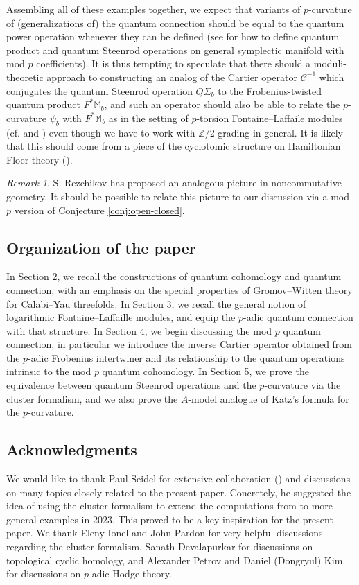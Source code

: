 \documentclass[reqno]{amsart}
\numberwithin{equation}{section}
\numberwithin{equation}{section}
\numberwithin{equation}{section}
\theoremstyle{definition}
\theoremstyle{remark}
\theoremstyle{remark}
\newtheorem{rem}[thm]{Remark}
\begin{document}
Assembling all of these examples together, we expect that variants of $p$-curvature of (generalizations of) the quantum connection should be equal to the quantum power operation whenever they can be defined (see \cite{Bai_Xu_2026} for how to define quantum product and quantum Steenrod operations on general symplectic manifold with mod $p$ coefficients). It is thus tempting to speculate that there should a moduli-theoretic approach to constructing an analog of the Cartier operator $\mathcal{C}^{-1}$ which conjugates the quantum Steenrod operation $Q\Sigma_b$ to the Frobenius-twisted quantum product $F^*\mathbb{M}_b$, and such an operator should also be able to relate the $p$-curvature $\psi_b$ with $F^*\mathbb{M}_b$ as in the setting of $p$-torsion Fontaine--Laffaile modules (cf. \cite{katz-nilpotent} and \cite{PVV}) even though we have to work with $\mathbb{Z}/2$-grading in general. It is likely that this should come from a piece of the cyclotomic structure on Hamiltonian Floer theory (\cite{rezchikov2024cyclotomic}). 


\begin{rem}
    S. Rezchikov has proposed an analogous picture in noncommutative geometry. It should be possible to relate this picture to our discussion via a mod $p$ version of Conjecture \ref{conj:open-closed}.
\end{rem}


\subsection{Organization of the paper}
In Section 2, we recall the constructions of quantum cohomology and quantum connection, with an emphasis on the special properties of Gromov--Witten theory for Calabi--Yau threefolds. In Section 3, we recall the general notion of logarithmic Fontaine--Laffaille modules, and equip the $p$-adic quantum connection with that structure. In Section 4, we begin discussing the mod $p$ quantum connection, in particular we introduce the inverse Cartier operator obtained from the $p$-adic Frobenius intertwiner and its relationship to the quantum operations intrinsic to the mod $p$ quantum cohomology. In Section 5, we prove the equivalence between quantum Steenrod operations and the $p$-curvature via the cluster formalism, and we also prove the $A$-model analogue of Katz's formula for the $p$-curvature.


\subsection*{Acknowledgments} We would like to thank Paul Seidel for extensive collaboration (\cite{bai2025p, PS23}) and discussions on many topics closely related to the present paper. Concretely, he suggested the idea of using the cluster formalism to extend the computations from \cite{Lee23a} to more general examples in 2023. This proved to be a key inspiration for the present paper. We thank Eleny Ionel and John Pardon for very helpful discussions regarding the cluster formalism, Sanath Devalapurkar for discussions on topological cyclic homology, and Alexander Petrov and Daniel (Dongryul) Kim for discussions on $p$-adic Hodge theory.
\end{document}
